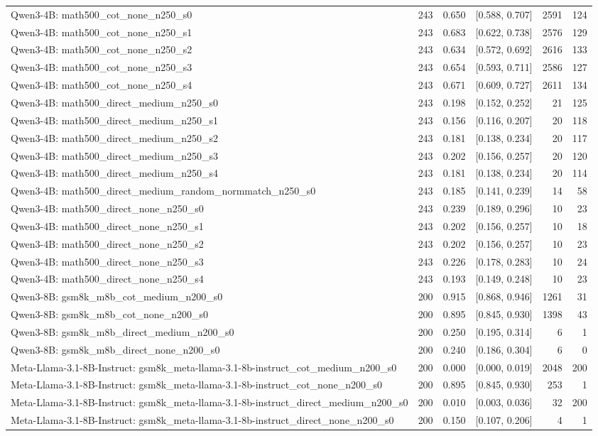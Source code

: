 \begin{tabular}{lrrrrr}
Qwen3-4B: math500\_cot\_none\_n250\_s0 & 243 & 0.650 & [0.588, 0.707] & 2591 & 124 \\
Qwen3-4B: math500\_cot\_none\_n250\_s1 & 243 & 0.683 & [0.622, 0.738] & 2576 & 129 \\
Qwen3-4B: math500\_cot\_none\_n250\_s2 & 243 & 0.634 & [0.572, 0.692] & 2616 & 133 \\
Qwen3-4B: math500\_cot\_none\_n250\_s3 & 243 & 0.654 & [0.593, 0.711] & 2586 & 127 \\
Qwen3-4B: math500\_cot\_none\_n250\_s4 & 243 & 0.671 & [0.609, 0.727] & 2611 & 134 \\
Qwen3-4B: math500\_direct\_medium\_n250\_s0 & 243 & 0.198 & [0.152, 0.252] & 21 & 125 \\
Qwen3-4B: math500\_direct\_medium\_n250\_s1 & 243 & 0.156 & [0.116, 0.207] & 20 & 118 \\
Qwen3-4B: math500\_direct\_medium\_n250\_s2 & 243 & 0.181 & [0.138, 0.234] & 20 & 117 \\
Qwen3-4B: math500\_direct\_medium\_n250\_s3 & 243 & 0.202 & [0.156, 0.257] & 20 & 120 \\
Qwen3-4B: math500\_direct\_medium\_n250\_s4 & 243 & 0.181 & [0.138, 0.234] & 20 & 114 \\
Qwen3-4B: math500\_direct\_medium\_random\_normmatch\_n250\_s0 & 243 & 0.185 & [0.141, 0.239] & 14 & 58 \\
Qwen3-4B: math500\_direct\_none\_n250\_s0 & 243 & 0.239 & [0.189, 0.296] & 10 & 23 \\
Qwen3-4B: math500\_direct\_none\_n250\_s1 & 243 & 0.202 & [0.156, 0.257] & 10 & 18 \\
Qwen3-4B: math500\_direct\_none\_n250\_s2 & 243 & 0.202 & [0.156, 0.257] & 10 & 23 \\
Qwen3-4B: math500\_direct\_none\_n250\_s3 & 243 & 0.226 & [0.178, 0.283] & 10 & 24 \\
Qwen3-4B: math500\_direct\_none\_n250\_s4 & 243 & 0.193 & [0.149, 0.248] & 10 & 23 \\
Qwen3-8B: gsm8k\_m8b\_cot\_medium\_n200\_s0 & 200 & 0.915 & [0.868, 0.946] & 1261 & 31 \\
Qwen3-8B: gsm8k\_m8b\_cot\_none\_n200\_s0 & 200 & 0.895 & [0.845, 0.930] & 1398 & 43 \\
Qwen3-8B: gsm8k\_m8b\_direct\_medium\_n200\_s0 & 200 & 0.250 & [0.195, 0.314] & 6 & 1 \\
Qwen3-8B: gsm8k\_m8b\_direct\_none\_n200\_s0 & 200 & 0.240 & [0.186, 0.304] & 6 & 0 \\
Meta-Llama-3.1-8B-Instruct: gsm8k\_meta-llama-3.1-8b-instruct\_cot\_medium\_n200\_s0 & 200 & 0.000 & [0.000, 0.019] & 2048 & 200 \\
Meta-Llama-3.1-8B-Instruct: gsm8k\_meta-llama-3.1-8b-instruct\_cot\_none\_n200\_s0 & 200 & 0.895 & [0.845, 0.930] & 253 & 1 \\
Meta-Llama-3.1-8B-Instruct: gsm8k\_meta-llama-3.1-8b-instruct\_direct\_medium\_n200\_s0 & 200 & 0.010 & [0.003, 0.036] & 32 & 200 \\
Meta-Llama-3.1-8B-Instruct: gsm8k\_meta-llama-3.1-8b-instruct\_direct\_none\_n200\_s0 & 200 & 0.150 & [0.107, 0.206] & 4 & 1 \\
\bottomrule
\end{tabular}
